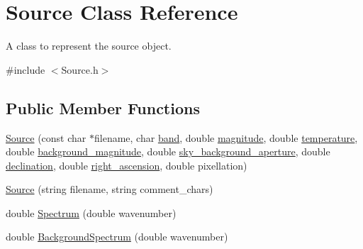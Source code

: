\hypertarget{classSource}{
\section{Source Class Reference}
\label{classSource}
}


A class to represent the source object.  




{\ttfamily \#include $<$Source.h$>$}

\subsection*{Public Member Functions}
\begin{DoxyCompactItemize}
\item 
\hyperlink{classSource_ac22e28a4b81a37fddf86ca720e93ec08}{Source} (const char $\ast$filename, char \hyperlink{classSource_a380447fc2b80c1b6bc5c2a8b31ed6b98}{band}, double \hyperlink{classSource_a6a63845ae2495f7d0b9758e969ae34a5}{magnitude}, double \hyperlink{classSource_a01ad608788eb4c0e4a7b2a6228398394}{temperature}, double \hyperlink{classSource_af8077dd4bf90295d11680d6dbd0baea9}{background\_\-magnitude}, double \hyperlink{classSource_aa21a6313f7ab7c41bb206ed05f0909cc}{sky\_\-background\_\-aperture}, double \hyperlink{classSource_acd65dbd79034b6bd27ce7bea9cddf80b}{declination}, double \hyperlink{classSource_a3378987660510b2ab4f02db5aa81791e}{right\_\-ascension}, double pixellation)
\item 
\hyperlink{classSource_a62904da7bc93de0418c16bc3243adc3f}{Source} (string filename, string comment\_\-chars)
\item 
double \hyperlink{classSource_a1b9f408aa6c5dcd5550e9cb28922e3af}{Spectrum} (double wavenumber)
\item 
double \hyperlink{classSource_a29c1541293674ddb2b9e7aa4cb130306}{BackgroundSpectrum} (double wavenumber)
\end{DoxyCompactItemize}
